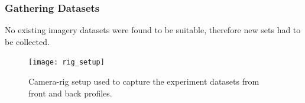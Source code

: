 \documentclass[10pt, compress]{beamer}
\begin{document}
%	
%	 
%  
%
% 
% 
%
%
%
%
%  
%  	  
%
% 
%
%


\begin{frame}[fragile]
  \frametitle{Gathering Datasets}
  
  No existing imagery datasets were found to be suitable, therefore new sets had to be collected.
  
  \vspace{5pt}
  
    \begin{figure}[ht!]
\centering
\texttt{[image: rig\_setup]}
\caption{Camera-rig setup used to capture the experiment datasets from front and back profiles.}
  \end{figure}
  
\end{frame}
\end{document}
